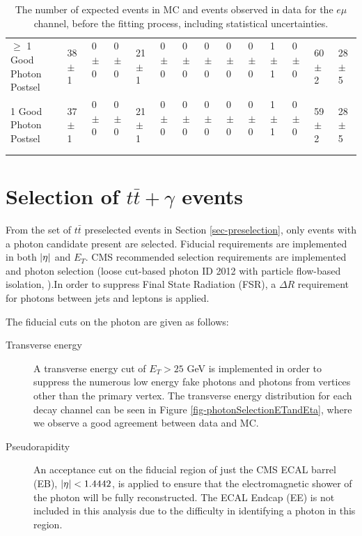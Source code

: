 \begin{table}
{\begin{tabular}{|l|l|l|l|l|l|l|l|l|l|l|l|l|l|}
$\geq$ 1 Good Photon Postsel & 38 $\pm$ 1 \ & 0 $\pm$ 0 \ & 0 $\pm$ 0 \ & 21 $\pm$ 1 \ & 0 $\pm$ 0 \ & 0 $\pm$ 0 \ & 0 $\pm$ 0 \ & 0 $\pm$ 0 \ & 0 $\pm$ 0 \ & 1 $\pm$ 1 \ & 0 $\pm$ 0 \ & 60 $\pm$ 2\ & 28 $\pm$ 5 \\
1 Good Photon Postsel & 37 $\pm$ 1 \ & 0 $\pm$ 0 \ & 0 $\pm$ 0 \ & 21 $\pm$ 1 \ & 0 $\pm$ 0 \ & 0 $\pm$ 0 \ & 0 $\pm$ 0 \ & 0 $\pm$ 0 \ & 0 $\pm$ 0 \ & 1 $\pm$ 1 \ & 0 $\pm$ 0 \ & 59 $\pm$ 2\ & 28 $\pm$ 5 \\
\hline
\end{tabular}
}
\caption{The number of expected events in MC and events observed in data for the $e\mu$ channel, before the fitting process, including statistical uncertainties.}
\end{table}

\section{Selection of $t\bar{t}+\gamma$ events} \label{sec-postselection}

From the set of $t\bar{t}$ preselected events in Section \ref{sec-preselection}, only events with a photon candidate present are selected.  Fiducial requirements are implemented in both $\lvert \eta \rvert$ and $E_T$. CMS recommended selection requirements are implemented and photon selection (loose cut-based photon ID 2012 with particle flow-based isolation, \cite{CutBasedIsolation2012}).In order to suppress Final State Radiation (FSR), a $\Delta R$ requirement for photons between jets and leptons is applied.

The fiducial cuts on the photon are given as follows:

\begin{description}

\item[Transverse energy] A transverse energy cut of $E_T > 25$ GeV is implemented in order to suppress the numerous low energy fake photons and photons from vertices other than the primary vertex. The transverse energy distribution for each decay channel can be seen in Figure \ref{fig-photonSelectionETandEta}, where we observe a good agreement between data and MC.

\item[Pseudorapidity] An acceptance cut on the fiducial region of just the CMS ECAL barrel (EB), $\lvert \eta \rvert < 1.4442$, is applied to ensure that the electromagnetic shower of the photon will be fully reconstructed. The ECAL Endcap (EE) is not included in this analysis due to the difficulty in identifying a photon in this region.

\end{description}

